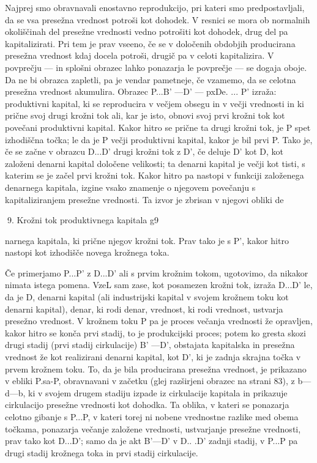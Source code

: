 \documentclass[kapital_02.tex]{subfiles}
\begin{document}
Najprej smo obravnavali enostavno reprodukcijo, pri kateri smo predpostavljali, da se vsa presežna vrednost potroši kot dohodek. V resnici se mora ob normalnih okoliščinah del presežne vrednosti vedno potrošiti kot dohodek, drug del pa kapitalizirati. Pri tem je prav vseeno, če se v določenih obdobjih producirana presežna vrednost kdaj docela potroši, drugič pa v celoti kapitalizira. V povprečju — in splošni obrazec lahko ponazarja le povprečje — se dogaja oboje. Da ne bi obrazca zapletli, pa je vendar pametneje, če vzamemo, da se celotna presežna vrednost akumulira. Obrazec P...B' —D' — pxDe. ... P' izraža: produktivni kapital, ki se reproducira v večjem obsegu in v večji vrednosti in ki prične svoj drugi krožni tok ali, kar je isto, obnovi svoj prvi krožni tok kot povečani produktivni kapital. Kakor hitro se prične ta drugi krožni tok, je P spet izhodiščna točka; le da je P večji produktivni kapital, kakor je bil prvi P. Tako je, če se začne v obrazcu D...D' drugi krožni tok z D', če deluje D' kot D, kot založeni denarni kapital določene velikosti; ta denarni kapital je večji kot tisti, s katerim se je začel prvi krožni tok. Kakor hitro pa nastopi v funkciji založenega denarnega kapitala, izgine vsako znamenje o njegovem povečanju s kapitaliziranjem presežne vrednosti. Ta izvor je zbrisan v njegovi obliki de

 9. Krožni tok produktivnega kapitala g9



 narnega kapitala, ki prične njegov krožni tok. Prav tako je s P', kakor hitro nastopi kot izhodišče novega krožnega toka.

Če primerjamo P...P' z D...D' ali s prvim krožnim tokom, ugotovimo, da nikakor nimata istega pomena. VzeL sam zase, kot posamezen krožni tok, izraža D...D' le, da je D, denarni kapital (ali industrijski kapital v svojem krožnem toku kot denarni kapital), denar, ki rodi denar, vrednost, ki rodi vrednost, ustvarja presežno vrednost. V krožnem toku P pa je proces večanja vrednosti že opravljen, kakor hitro se konča prvi stadij, to je produkcijski proces; potem ko gresta skozi drugi stadij (prvi stadij cirkulacije) B' —D', obstajata kapitalska in presežna vrednost že kot realizirani denarni kapital, kot D', ki je zadnja skrajna točka v prvem krožnem toku. To, da je bila producirana presežna vrednost, je prikazano v ebliki P.sa-P, obravnavani v začetku (glej razširjeni obrazec na strani 83), z b—d—b, ki v svojem drugem stadiju izpade iz cirkulacije kapitala in prikazuje cirkulacijo presežne vrednosti kot dohodka. Ta oblika, v kateri se ponazarja celotno gibanje s P...P, v kateri torej ni nobene vrednostne razlike med obema točkama, ponazarja večanje založene vrednosti, ustvarjanje presežne vrednosti, prav tako kot D...D'; samo da je akt B'—D' v D.. .D' zadnji stadij, v P...P pa drugi stadij krožnega toka in prvi stadij cirkulacije.
\end{document}
